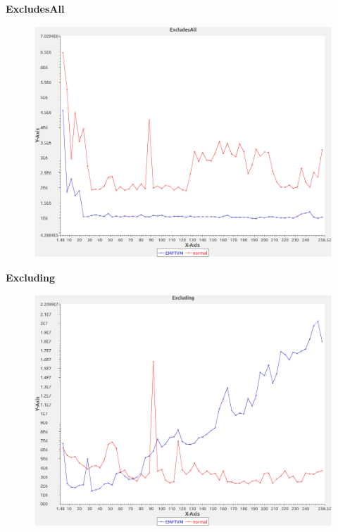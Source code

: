 \noindent\textbf{ExcludesAll}

\begin{figure}[h]
\centering
\includegraphics[width=\textwidth]{graphs/sequence/ExcludesAll}
\end{figure}
\pagebreak

\noindent\textbf{Excluding}

\begin{figure}[h]
\centering
\includegraphics[width=\textwidth]{graphs/sequence/Excluding}
\end{figure}
\pagebreak

